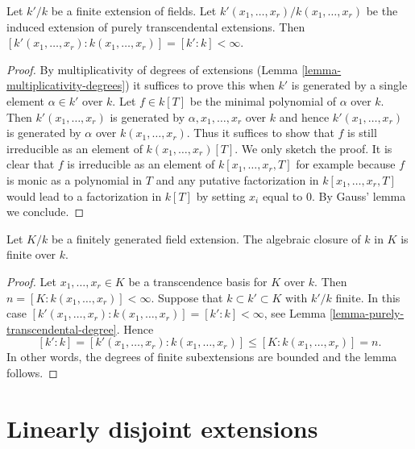 \begin{lemma}
\label{lemma-purely-transcendental-degree}
Let $k'/k$ be a finite extension of fields. Let
$k'(x_1, \ldots, x_r)/k(x_1, \ldots, x_r)$ be the
induced extension of purely transcendental extensions.
Then $[k'(x_1, \ldots, x_r) : k(x_1, \ldots, x_r)] = [k' : k] < \infty$.
\end{lemma}

\begin{proof}
By multiplicativity of degrees of extensions
(Lemma \ref{lemma-multiplicativity-degrees})
it suffices to prove this when $k'$ is generated by a single element
$\alpha \in k'$ over $k$. Let $f \in k[T]$ be the minimal polynomial
of $\alpha$ over $k$. Then $k'(x_1, \ldots, x_r)$ is generated
by $\alpha, x_1, \ldots, x_r$ over $k$ and hence $k'(x_1, \ldots, x_r)$
is generated by $\alpha$ over $k(x_1, \ldots, x_r)$.
Thus it suffices to show that $f$ is still irreducible as
an element of $k(x_1, \ldots, x_r)[T]$. We only sketch the proof.
It is clear that $f$ is irreducible as an element of
$k[x_1, \ldots, x_r, T]$ for example because $f$ is monic
as a polynomial in $T$ and any putative factorization in
$k[x_1, \ldots, x_r, T]$ would lead to a factorization in $k[T]$
by setting $x_i$ equal to $0$. By Gauss' lemma we conclude.
\end{proof}

\begin{lemma}
\label{lemma-algebraic-closure-in-finitely-generated}
Let $K/k$ be a finitely generated field extension.
The algebraic closure of $k$ in $K$ is finite over $k$.
\end{lemma}

\begin{proof}
Let $x_1, \ldots, x_r \in K$ be a transcendence basis for $K$
over $k$. Then $n = [K : k(x_1, \ldots, x_r)] < \infty$.
Suppose that $k \subset k' \subset K$ with $k'/k$ finite.
In this case
$[k'(x_1, \ldots, x_r) : k(x_1, \ldots, x_r)] = [k' : k] < \infty$, see
Lemma \ref{lemma-purely-transcendental-degree}.
Hence
$$
[k' : k] = [k'(x_1, \ldots, x_r) : k(x_1, \ldots, x_r)] \leq
[K : k(x_1, \ldots, x_r)] = n.
$$
In other words, the degrees of finite subextensions are bounded
and the lemma follows.
\end{proof}






\section{Linearly disjoint extensions}
\label{section-linearly-disjoint}

